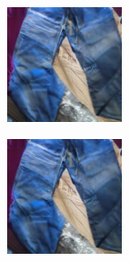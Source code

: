 \documentclass{article}
\begin{document}
\begin{figure}
\begin{subfigure}[b]{0.5\linewidth}
\begin{subfigure}[b]{0.242\linewidth}
        \end{subfigure}
        \begin{subfigure}[b]{0.242\linewidth}
        \includegraphics[width=\linewidth]{figures/imagenet128/solver_samples/imagenet128_fm_ot_319_20.png}
        \end{subfigure}
        \begin{subfigure}[b]{0.242\linewidth}
        \includegraphics[width=\linewidth]{figures/imagenet128/solver_samples/imagenet128_fm_ot_319_50.png}
        \end{subfigure}
    \end{subfigure}\\
    

\end{figure}
\end{document}
